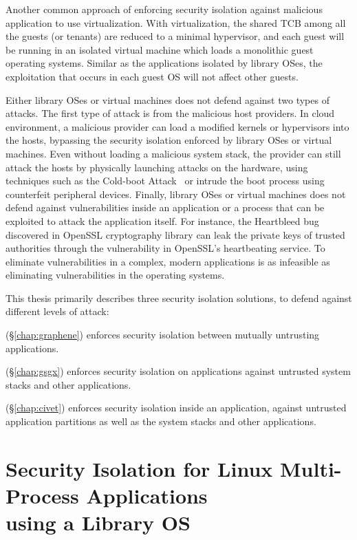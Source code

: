 Another common approach of enforcing security isolation against malicious application to use virtualization.
With virtualization, the shared TCB among all the guests (or tenants)
are reduced to a minimal hypervisor,
and each guest will be running in an isolated virtual machine which loads a monolithic guest operating systems.
Similar as the applications isolated by library OSes, the exploitation that occurs in each guest OS will not affect other guests.

Either library OSes or virtual machines does not defend against two types of attacks.
The first type of attack is from the malicious host providers.
In cloud environment, a malicious provider can load a modified kernels or hypervisors into the hosts,
bypassing the security isolation enforced by library OSes or virtual machines.
Even without loading a malicious system stack,
the provider can still attack the hosts by physically launching attacks on the hardware, using techniques such as the Cold-boot Attack~\citep{halderman09coldboot} or 
intrude the boot process using counterfeit peripheral devices.
Finally, library OSes or virtual machines does not defend against vulnerabilities
inside an application or a process
that can be exploited to attack the application itself.
For instance, the Heartbleed bug~\citep{heartbleed} discovered in OpenSSL cryptography library
can leak the private keys of trusted authorities through the vulnerability in OpenSSL's heartbeating service.
To eliminate vulnerabilities in a complex, modern applications is as infeasible as eliminating vulnerabilities in the operating systems.

This thesis primarily describes three security isolation solutions,
to defend against different levels of attack:
\begin{compactitem}
\item {\em \graphene{}} (\S\ref{chap:graphene}) enforces security isolation between mutually untrusting applications.
\item {\em \gsgx{}} (\S\ref{chap:gsgx}) enforces security isolation on applications against untrusted system stacks and other applications.
\item {\em \civet{}} (\S\ref{chap:civet}) enforces security isolation inside an application, against untrusted application partitions as well as the system stacks and other applications.
\end{compactitem}

\section{Security Isolation for Linux Multi-Process Applications\\ using a Library OS}
\label{sec:intro:graphene}

